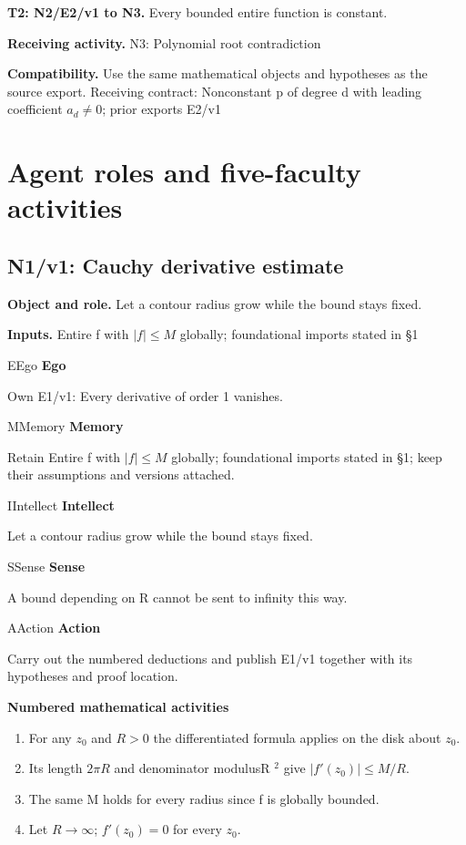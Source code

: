 \documentclass[preprint,12pt,aps,pra,showkeys,amsmath,amssymb,superscriptaddress,floatfix]{revtex4-2}
\theoremstyle{definition}
\theoremstyle{remark}
\newcommand{\mmfaculty}[3]{%
 \begin{mmfacultybox}{#1}{#2}
 {\sffamily\bfseries\color{MMBlue}#2}\par\smallskip #3
 \end{mmfacultybox}}
\newcommand{\field}[2]{\par\smallskip\noindent\textbf{#1.} #2\par}
\begin{document}
\field{T2: N2/E2/v1 to N3}{Every bounded entire function is constant.}

\field{Receiving activity}{N3: Polynomial root contradiction}

\field{Compatibility}{Use the same mathematical objects and hypotheses as the source export.
Receiving contract: Nonconstant p of degree d with leading coefficient
\(a_d\ne 0\); prior exports E2/v1}

\endgroup

\clearpage\section{Agent roles and five-faculty activities}\begingroup\small\linespread{1.05}\selectfont{}

\subsection{N1/v1: Cauchy derivative estimate}

\field{Object and role}{Let a contour radius grow while the bound stays fixed.}

\field{Inputs}{Entire f with \(|f|\le M\) globally; foundational imports stated in §1}

\mmfaculty{E}{Ego}{Own E1/v1: Every derivative of order 1 vanishes.}

\mmfaculty{M}{Memory}{Retain Entire f with \(|f|\le M\) globally; foundational imports stated
in §1; keep their assumptions and versions attached.}

\mmfaculty{I}{Intellect}{Let a contour radius grow while the bound stays fixed.}

\mmfaculty{S}{Sense}{A bound depending on R cannot be sent to infinity this way.}

\mmfaculty{A}{Action}{Carry out the numbered deductions and publish E1/v1 together with its
hypotheses and proof location.}

\smallskip\noindent\textbf{Numbered mathematical activities}

\begin{enumerate}[label=N1.\arabic*,leftmargin=3.4em]

\item For any \(z_{0}\) and \(R>0\) the differentiated formula applies on the
disk about \(z_{0}\).

\item Its length \(2\pi R\) and denominator modulusR \(^{2}\) give
\(|f'(z_{0})|\le M/R\).

\item The same M holds for every radius since f is globally bounded.

\item Let \(R\to \infty\); \(f'(z_{0})=0\) for every \(z_{0}\).

\end{enumerate}
\end{document}
